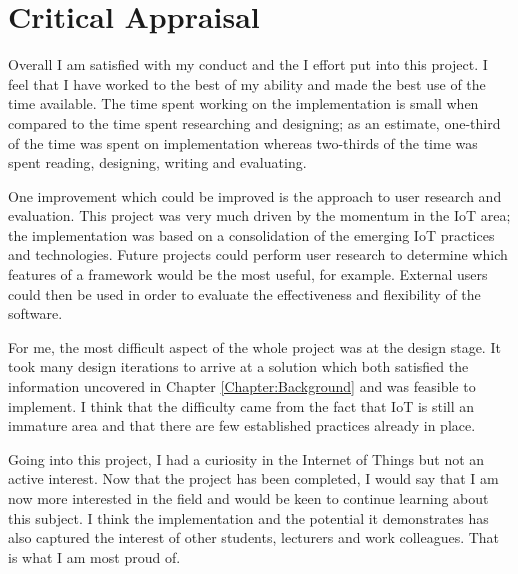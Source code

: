   \section{Critical Appraisal}
    Overall I am satisfied with my conduct and the I effort put into this project. I feel that I have worked to the best of my ability and made the best use of the time available. The time spent working on the implementation is small when compared to the time spent researching and designing; as an estimate, one-third of the time was spent on implementation whereas two-thirds of the time was spent reading, designing, writing and evaluating.

    One improvement which could be improved is the approach to user research and evaluation. This project was very much driven by the momentum in the IoT area; the implementation was based on a consolidation of the emerging IoT practices and technologies. Future projects could perform user research to determine which features of a framework would be the most useful, for example. External users could then be used in order to evaluate the effectiveness and flexibility of the software.

    For me, the most difficult aspect of the whole project was at the design stage. It took many design iterations to arrive at a solution which both satisfied the information uncovered in Chapter \ref{Chapter:Background} and was feasible to implement. I think that the difficulty came from the fact that IoT is still an immature area and that there are few established practices already in place.

    Going into this project, I had a curiosity in the Internet of Things but not an active interest. Now that the project has been completed, I would say that I am now more interested in the field and would be keen to continue learning about this subject. I think the implementation and the potential it demonstrates has also captured the interest of other students, lecturers and work colleagues. That is what I am most proud of.
